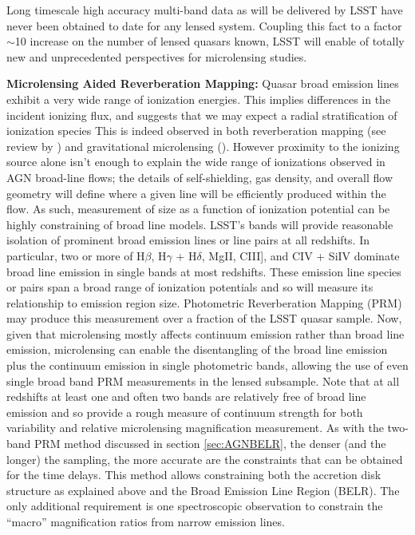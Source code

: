 Long timescale high accuracy multi-band data as will be delivered by
LSST have never been obtained to date for any lensed system. Coupling this fact
to a factor $\sim$10 increase on the number of lensed quasars known, LSST will
enable of totally new and unprecedented perspectives for microlensing studies.

%

{\bf Microlensing Aided Reverberation Mapping:} Quasar broad emission lines exhibit a very wide range of ionization energies. This implies differences in the incident ionizing flux, and suggests that we may expect a radial stratification of ionization species This is indeed observed in both reverberation mapping (see review by \citealt{gaskell2009}) and gravitational microlensing (\citealt{guerras2013}). However proximity to the ionizing source alone isn't enough to explain the wide range of ionizations observed in AGN broad-line flows; the details of self-shielding, gas density, and overall flow geometry will define where a given line will be efficiently produced within the flow. As such, measurement of size as a function of ionization potential can be highly constraining of broad line models. LSST's bands will provide reasonable isolation of prominent broad emission lines or line pairs at all redshifts. In particular, two or more of H$\beta$, H$\gamma$ + H$\delta$, MgII, CIII], and CIV + SiIV dominate broad line emission in single bands at most redshifts. These emission line species or pairs span a broad range of ionization potentials and so will measure its relationship to emission region size. Photometric Reverberation Mapping (PRM) may produce this measurement over a fraction of the LSST quasar sample. Now, given that microlensing mostly affects continuum emission rather than  broad line emission, microlensing can enable the disentangling of the broad line emission plus the continuum emission in single photometric bands, allowing the use of even single broad band PRM measurements \citep{SluseandTewes2014} in the lensed subsample. Note that at all redshifts at least one and often two bands are relatively free of broad line emission and so provide a rough measure of continuum strength for both variability and relative microlensing magnification measurement. As with the two-band PRM method discussed in section \ref{sec:AGNBELR}, the
denser (and the longer) the sampling, the more accurate are the constraints that
can be obtained for the time delays. This method allows constraining both the
accretion disk structure as explained above and the Broad Emission Line Region (BELR). The only additional
requirement is one spectroscopic observation to constrain the ``macro''
magnification ratios from narrow emission lines.

